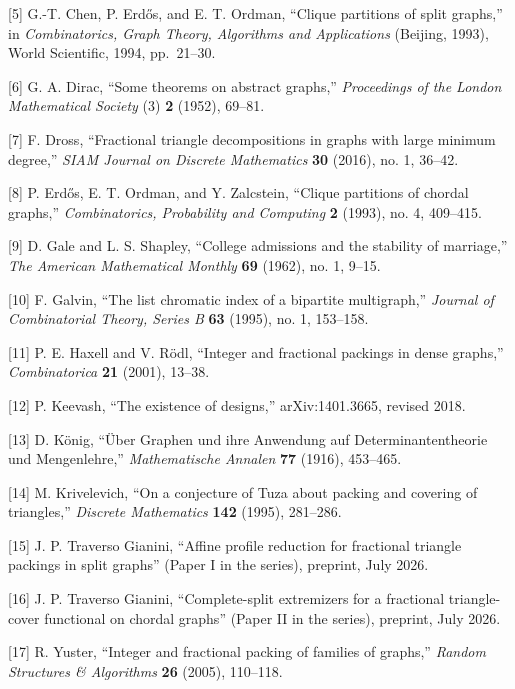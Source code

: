\documentclass[
  american,
  11pt,
  a4paper,
]{article}
\begin{document}
{[}5{]} G.-T. Chen, P. Erdős, and E. T. Ordman, ``Clique partitions of split graphs,'' in \emph{Combinatorics, Graph Theory, Algorithms and Applications} (Beijing, 1993), World Scientific, 1994, pp.~21--30.

{[}6{]} G. A. Dirac, ``Some theorems on abstract graphs,'' \emph{Proceedings of the London Mathematical Society} (3) \textbf{2} (1952), 69--81.

{[}7{]} F. Dross, ``Fractional triangle decompositions in graphs with large minimum degree,'' \emph{SIAM Journal on Discrete Mathematics} \textbf{30} (2016), no. 1, 36--42.

{[}8{]} P. Erdős, E. T. Ordman, and Y. Zalcstein, ``Clique partitions of chordal graphs,'' \emph{Combinatorics, Probability and Computing} \textbf{2} (1993), no. 4, 409--415.

{[}9{]} D. Gale and L. S. Shapley, ``College admissions and the stability of marriage,'' \emph{The American Mathematical Monthly} \textbf{69} (1962), no. 1, 9--15.

{[}10{]} F. Galvin, ``The list chromatic index of a bipartite multigraph,'' \emph{Journal of Combinatorial Theory, Series B} \textbf{63} (1995), no. 1, 153--158.

{[}11{]} P. E. Haxell and V. Rödl, ``Integer and fractional packings in dense graphs,'' \emph{Combinatorica} \textbf{21} (2001), 13--38.

{[}12{]} P. Keevash, ``The existence of designs,'' arXiv:1401.3665, revised 2018.

{[}13{]} D. König, ``Über Graphen und ihre Anwendung auf Determinantentheorie und Mengenlehre,'' \emph{Mathematische Annalen} \textbf{77} (1916), 453--465.

{[}14{]} M. Krivelevich, ``On a conjecture of Tuza about packing and covering of triangles,'' \emph{Discrete Mathematics} \textbf{142} (1995), 281--286.

{[}15{]} J. P. Traverso Gianini, ``Affine profile reduction for fractional triangle packings in split graphs'' (Paper I in the series), preprint, July 2026.

{[}16{]} J. P. Traverso Gianini, ``Complete-split extremizers for a fractional triangle-cover functional on chordal graphs'' (Paper II in the series), preprint, July 2026.

{[}17{]} R. Yuster, ``Integer and fractional packing of families of graphs,'' \emph{Random Structures \& Algorithms} \textbf{26} (2005), 110--118.
\endgroup
\end{document}
